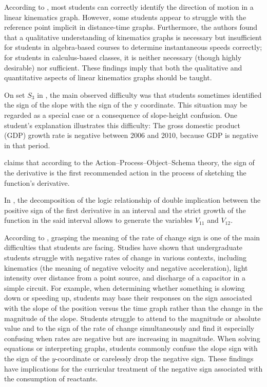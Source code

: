 \documentclass[11pt]{book}
\begin{document}
According to \cite{bollen2016generalizing}, most students can
correctly identify the direction of motion in a linear kinematics
graph. However, some students appear to struggle with the reference
point implicit in distance-time graphs. Furthermore, the authors found
that a qualitative understanding of kinematics graphs is necessary
but insufficient for students in algebra-based courses to determine
instantaneous speeds correctly; for students in calculus-based classes,
it is neither necessary (though highly desirable) nor sufficient.
These findings imply that both the qualitative and quantitative aspects of linear
kinematics graphs should be taught.

On set $S_{3}$ in \cite{ivanjek2016student}, the main observed difficulty
was that students sometimes identified the sign of the slope with
the sign of the y coordinate. This situation may be regarded as a special
case or a consequence of slope-height confusion. One student's
explanation illustrates this difficulty: \textquotedbl The gross domestic product (GDP) growth
rate is negative between 2006 and 2010, because GDP is negative in
that period\textquotedbl .

\cite{borji2018application} claims that according to the Action–Process–Object–Schema theory,
the sign of the derivative is the first recommended action in the
process of sketching the function's derivative.

In \cite{fuentealba2018understanding}, the decomposition of the logic relationship of double implication
between the positive sign of the first derivative in an interval and
the strict growth of the function in the said interval allows to
generate the variables $V_{11}$ and $V_{12}$.

According to \cite{seethaler2018analyzing}, grasping the meaning of the rate of change sign is one of the main difficulties that
students are facing.
Studies have shown that undergraduate students struggle with
negative rates of change in various contexts, including kinematics
(the meaning of negative velocity and negative acceleration), light
intensity over distance from a point source, and discharge of a capacitor
in a simple circuit. For example, when determining whether something
is slowing down or speeding up, students may base their responses
on the sign associated with the slope of the position versus the time
graph rather than the change in the magnitude of the slope. Students struggle
to attend to the magnitude or absolute value and to the sign of the rate
of change simultaneously and find it especially confusing when rates
are negative but are increasing in magnitude. When solving equations or
interpreting graphs, students commonly confuse the slope sign with
the sign of the $y$-coordinate or carelessly drop the negative sign.
These findings have implications for the curricular treatment of the negative
sign associated with the consumption of reactants.
\end{document}
